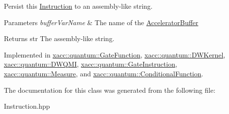 Persist this \hyperlink{a01657}{Instruction} to an assembly-\/like string.


\begin{DoxyParams}{Parameters}
{\em buffer\+Var\+Name} & The name of the \hyperlink{a01625}{Accelerator\+Buffer} \\
\hline
\end{DoxyParams}
\begin{DoxyReturn}{Returns}
str The assembly-\/like string. 
\end{DoxyReturn}


Implemented in \hyperlink{a01249_aa1950776ae84bad2d0795a0441f910e7}{xacc\+::quantum\+::\+Gate\+Function}, \hyperlink{a01221_adbc3fdd080ebba20bc620b8832979f16}{xacc\+::quantum\+::\+D\+W\+Kernel}, \hyperlink{a01225_a8d8742bb6743cf6e49f95966d05bbec2}{xacc\+::quantum\+::\+D\+W\+Q\+MI}, \hyperlink{a01253_a089a5da67ff40ac1a6f56e64589822d9}{xacc\+::quantum\+::\+Gate\+Instruction}, \hyperlink{a01285_a1c51a5d68294dcb2ba1a9fbea63a730f}{xacc\+::quantum\+::\+Measure}, and \hyperlink{a01273_aca7a5f849fece6fc28a904efee9a3370}{xacc\+::quantum\+::\+Conditional\+Function}.



The documentation for this class was generated from the following file\+:\begin{DoxyCompactItemize}
\item 
Instruction.\+hpp\end{DoxyCompactItemize}
